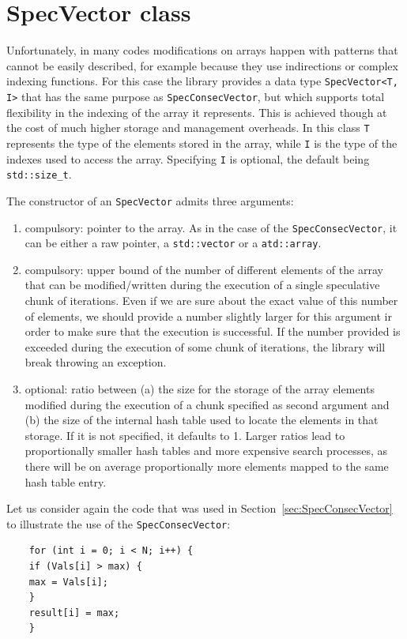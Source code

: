 \documentclass[11pt,a4paper]{article}
\begin{document}
	
	\section{SpecVector class}
	
	Unfortunately, in many codes modifications on arrays happen with patterns that cannot be easily described, for example because they use indirections or complex indexing functions. For this case the library provides a data type {\tt SpecVector<T, I>} that has the same purpose as {\tt SpecConsecVector}, but which supports total flexibility in the indexing of the array it represents. This is achieved though at the cost of much higher storage and management overheads. In this class {\tt T} represents the type of the elements stored in the array, while {\tt I} is the type of the indexes used to access the array. Specifying {\tt I} is optional, the default being {\tt std::size\_t}. 
	
	The constructor of an {\tt SpecVector} admits three arguments:
	\begin{enumerate}
		\item compulsory: pointer to the array. As in the case of the {\tt SpecConsecVector}, it can be either a raw pointer, a {\tt std::vector} or a {\tt atd::array}.
		\item compulsory: upper bound of the number of different elements of the array that can be modified/written during the execution of a single speculative chunk of iterations. Even if we are sure about the exact value of this number of elements, we should provide a number slightly larger for this argument ir order to make sure that the execution is successful. If the number provided is exceeded during the execution of some chunk of iterations, the library will break throwing an exception. 
		\item optional: ratio between (a) the size for the storage of the array elements modified during the execution of a chunk specified as second argument and (b) the size of the internal hash table used to locate the elements in that storage. If it is not specified, it defaults to 1. Larger ratios lead to proportionally smaller hash tables and more expensive search processes, as there will be on average proportionally more elements mapped to the same hash table entry.
	\end{enumerate}
	
	Let us consider again the code that was used in Section~\ref{sec:SpecConsecVector} to illustrate the use of the {\tt SpecConsecVector}:
	\begin{verbatim}
	for (int i = 0; i < N; i++) {
	if (Vals[i] > max) {
	max = Vals[i];
	}
	result[i] = max;
	}
	\end{verbatim}
	
\end{document}
